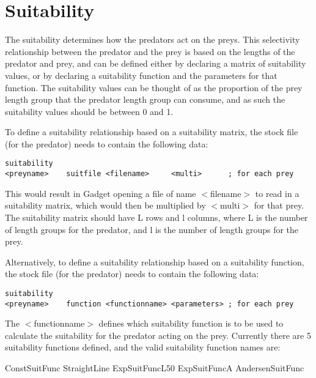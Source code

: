 \documentclass [a4paper, 10pt]{book}
\begin{document}
\section{Suitability}\label{subsec:suitability}
The suitability determines how the predators act on the preys.  This selectivity relationship between the predator and the prey is based on the lengths of the predator and prey, and can be defined either by declaring a matrix of suitability values, or by declaring a suitability function and the parameters for that function.  The suitability values can be thought of as the proportion of the prey length group that the predator length group can consume, and as such the suitability values should be between 0 and 1.

\bigskip
To define a suitability relationship based on a suitability matrix, the stock file (for the predator) needs to contain the following data:

{\small\begin{verbatim}
suitability
<preyname>    suitfile <filename>     <multi>      ; for each prey
\end{verbatim}}

This would result in Gadget opening a file of name $<$filename$>$ to read in a suitability matrix, which would then be multiplied by $<$multi$>$ for that prey.  The suitability matrix should have L rows and l columns, where L is the number of length groups for the predator, and l is the number of length groups for the prey.

\bigskip
Alternatively, to define a suitability relationship based on a suitability function, the stock file (for the predator) needs to contain the following data:

{\small\begin{verbatim}
suitability
<preyname>    function <functionname> <parameters> ; for each prey
\end{verbatim}}

The $<$functionname$>$ defines which suitability function is to be used to calculate the suitability for the predator acting on the prey.  Currently there are 5 suitability functions defined, and the valid suitability function names are:

\bigskip
ConstSuitFunc\newline
StraightLine\newline
ExpSuitFuncL50\newline
ExpSuitFuncA\newline
AndersenSuitFunc
\end{document}
